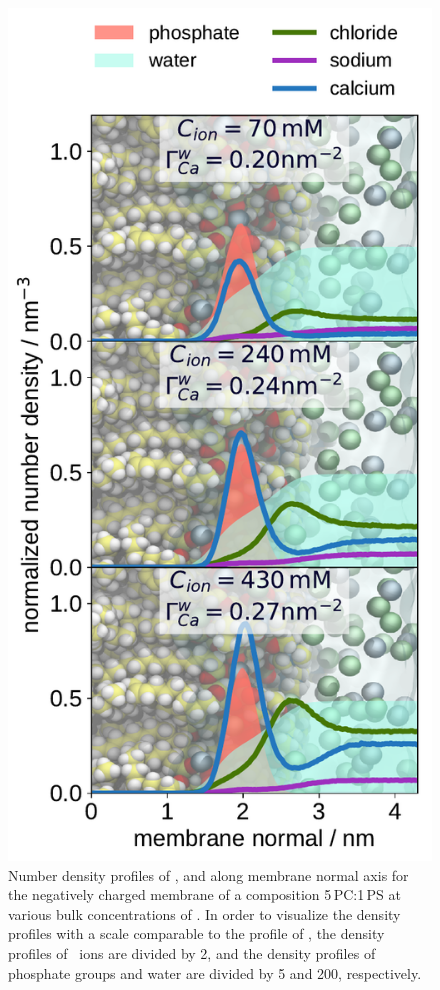 \begin{figure}[htbp!] 
  \centering 
  \includegraphics[width=\figwidth]{../img/ecc_pops/density_profiles_ca_na_cl_wat_phos_models-compar_1-3_CaCl2-series.pdf}
  \caption{\label{fig:cacl-dens_PCPS} 
    Number density profiles of ,  and  along membrane normal axis 
    for the negatively charged membrane of a composition 5\,PC:1\,PS
    at various bulk concentrations of . 
    In order to visualize the density profiles with a scale comparable to the profile of ,  
    the density profiles of~ ions are divided by 2, and 
    the density profiles of phosphate groups and water are divided by 5 and 200, respectively.  
    } 
\end{figure} 
 


